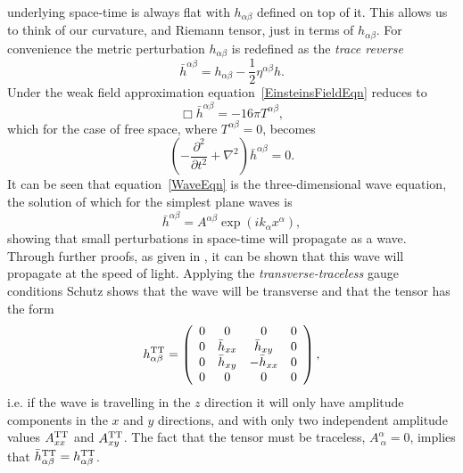 underlying space-time is always flat with $h_{\alpha\beta}$ defined on top of it. This allows us to
think of our curvature, and Riemann tensor, just in terms of $h_{\alpha\beta}$. For convenience the
metric perturbation $h_{\alpha\beta}$ is redefined as the {\it trace reverse}
\begin{equation}
\bar{h}^{\alpha\beta} = h_{\alpha\beta}- \frac{1}{2}\eta^{\alpha\beta}h.
\end{equation} 
Under the weak field approximation
equation~\ref{EinsteinsFieldEqn} reduces to
\begin{equation}\label{WeakFieldEqn}
\Box\bar{h}^{\alpha\beta} = -16\pi{}T^{\alpha\beta},
\end{equation}
which for the case of free space, where $T^{\alpha\beta} = 0$, becomes
\begin{equation}\label{WaveEqn}
\left(-\frac{\partial^2}{\partial{}t^2} + \nabla^2\right)\bar{h}^{\alpha\beta} = 0.
\end{equation}
It can be seen that equation~\ref{WaveEqn} is the three-dimensional wave equation, the solution of
which for the simplest plane waves is
\begin{equation}
\bar{h}^{\alpha\beta} = A^{\alpha\beta}\exp{(ik_{\alpha}x^{\alpha})},
\end{equation}
showing that small perturbations in space-time will propagate as a wave. Through further proofs, as
given in \cite{Schutz:1985}, it can be shown that this wave will propagate at the speed of light.
Applying the {\it transverse-traceless} gauge conditions Schutz \cite{Schutz:1985} shows that the
wave will be transverse and that the tensor has the form
\begin{equation}
h_{\alpha\beta}^{\rm TT} = \left( \begin{array}{cccc}
0 & 0 & 0 & 0 \\
0 & \bar{h}_{xx} & \bar{h}_{xy} & 0 \\
0 & \bar{h}_{xy} & -\bar{h}_{xx} & 0 \\
0 & 0 & 0 & 0
\end{array} \right),
\end{equation}
i.e. if the wave is travelling in the $z$ direction it will only have amplitude components in the
$x$ and $y$ directions, and with only two independent amplitude values $A_{xx}^{\rm TT}$ and
$A_{xy}^{\rm TT}$. The fact that the tensor must be traceless, $A^{\alpha}_{~\alpha}=0$, implies
that $\bar{h}_{\alpha\beta}^{\rm TT} = h_{\alpha\beta}^{\rm TT}$.

